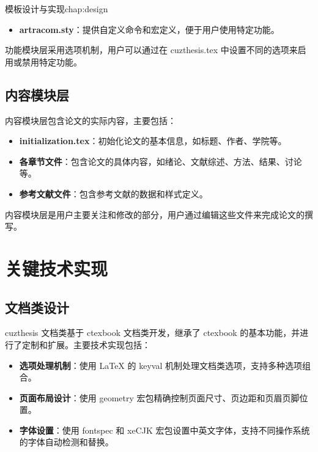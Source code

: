 \begin{cuzchapter}{模板设计与实现}{chap:design}
\begin{itemize}
        \item \textbf{artracom.sty}：提供自定义命令和宏定义，便于用户使用特定功能。
    \end{itemize}

    功能模块层采用选项机制，用户可以通过在 cuzthesis.tex 中设置不同的选项来启用或禁用特定功能。

    \subsection{内容模块层}

    内容模块层包含论文的实际内容，主要包括：

    \begin{itemize}
        \item \textbf{initialization.tex}：初始化论文的基本信息，如标题、作者、学院等。

        \item \textbf{各章节文件}：包含论文的具体内容，如绪论、文献综述、方法、结果、讨论等。

        \item \textbf{参考文献文件}：包含参考文献的数据和样式定义。
    \end{itemize}

    内容模块层是用户主要关注和修改的部分，用户通过编辑这些文件来完成论文的撰写。

    \section{关键技术实现}\label{sec:key-technologies}

    \subsection{文档类设计}

    cuzthesis 文档类基于 ctexbook 文档类开发，继承了 ctexbook 的基本功能，并进行了定制和扩展。主要技术实现包括：

    \begin{itemize}
        \item \textbf{选项处理机制}：使用 \LaTeX{} 的 keyval 机制处理文档类选项，支持多种选项组合。

        \item \textbf{页面布局设计}：使用 geometry 宏包精确控制页面尺寸、页边距和页眉页脚位置。

        \item \textbf{字体设置}：使用 fontspec 和 xeCJK 宏包设置中英文字体，支持不同操作系统的字体自动检测和替换。


\end{itemize}
\end{cuzchapter}
